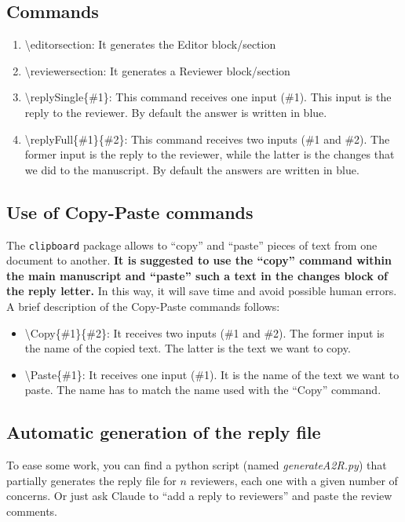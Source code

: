 \documentclass[main.tex]{subfiles}
\begin{document}
\begin{guidance}
\subsection{Commands}
\begin{enumerate}
    \item \textbackslash editorsection: It generates the Editor block/section
    \item \textbackslash reviewersection: It generates a Reviewer block/section
    \item \textbackslash replySingle\{\#1\}: This command receives one input (\#1). This input is the reply to the reviewer. By default the answer is written in blue.
    \item \textbackslash replyFull\{\#1\}\{\#2\}: This command receives two inputs (\#1 and \#2). The former input is the reply to the reviewer, while the latter is the changes that we did to the manuscript. By default the answers are written in blue.
\end{enumerate}


\subsection{Use of Copy-Paste commands}
The \texttt{clipboard} package allows to ``copy'' and ``paste'' pieces of text from one document to another.
\textbf{It is suggested to use the ``copy'' command within the main manuscript and ``paste'' such a text in the changes block of the reply letter.}
In this way, it will save time and avoid possible human errors.
A brief description of the Copy-Paste commands follows:
\begin{itemize}
    \item \textbackslash Copy\{\#1\}\{\#2\}: It receives two inputs (\#1 and \#2). The former input is the name of the copied text. The latter is the text we want to copy.
    \item \textbackslash Paste\{\#1\}: It receives one input (\#1). It is the name of the text we want to paste. The name has to match the name used with the ``Copy'' command.
\end{itemize}

\subsection{Automatic generation of the reply file}
To ease some work, \href{https://github.com/EstebanJGC/Latex_Templates_Macros.git}{} you can find a python script (named \textit{generateA2R.py}) that partially generates the reply file for $n$ reviewers, each one with a given number of concerns. Or just ask Claude to ``add a reply to reviewers'' and paste the review comments.


\end{guidance}
\end{document}
